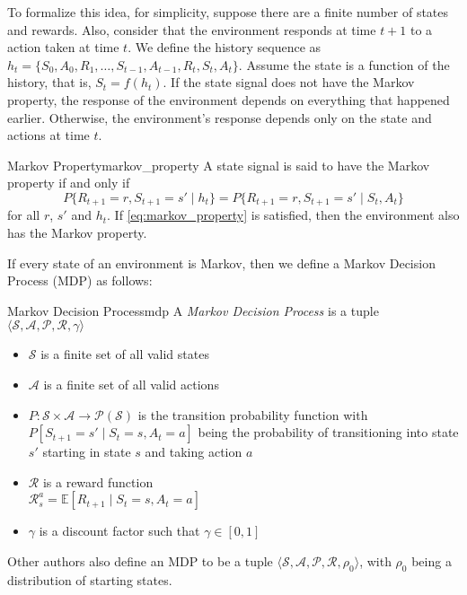 To formalize this idea, for simplicity, suppose there are a finite number of states and rewards. Also, consider that the environment responds at time $t+1$ to a action taken at time $t$. We define the history sequence as $h_t = \{S_0, A_0, R_1, \dots, S_{t-1}, A_{t-1}, R_t, S_t, A_t\}$. Assume the state is a function of the history, that is, $S_t = f(h_t)$. If the state signal does not have the Markov property, the response of the environment depends on everything that happened earlier. Otherwise, the environment's response depends only on the state and actions at time $t$.
\begin{definition}{Markov Property}{markov_property}
      A state signal is said to have the Markov property if and only if
      \begin{equation}\label{eq:markov_property}
            P\{R_{t+1} = r, S_{t+1} = s' \mid h_t\} = P\{R_{t+1} = r, S_{t+1} = s' \mid S_t, A_t\}
      \end{equation}
      for all $r$, $s'$ and $h_t$. If \ref{eq:markov_property} is satisfied, then the environment also has the Markov property.   
\end{definition}
If every state of an environment is Markov, then we define a Markov Decision Process (MDP) as follows:
\begin{definition}{Markov Decision Process}{mdp}
      A \textit{Markov Decision Process} is a tuple $\langle \mathcal{S}, \mathcal{A}, \mathcal{P}, \mathcal{R}, \gamma \rangle$
      \begin{itemize}
            \item $\mathcal{S}$ is a finite set of all valid states
            \item $\mathcal{A}$ is a finite set of all valid actions
            \item $P \colon \mathcal{S} \times \mathcal{A} \to \mathcal{P}(\mathcal{S})$ is the transition probability function with $P[S_{t+1} = s' \mid S_t = s, A_t = a]$ being the probability of transitioning into state $s'$ starting in state $s$ and taking action $a$
            \item $\mathcal{R}$ is a reward function\\$\mathcal{R}^a_s = \mathbb{E}[R_{t+1} \mid S_t = s, A_t = a]$
            \item $\gamma$ is a discount factor such that $\gamma \in [0, 1]$
      \end{itemize}  
\end{definition}
Other authors also define an MDP to be a tuple $\langle \mathcal{S}, \mathcal{A}, \mathcal{P}, \mathcal{R}, \rho_0 \rangle$, with $\rho_0$ being a distribution of starting states.

